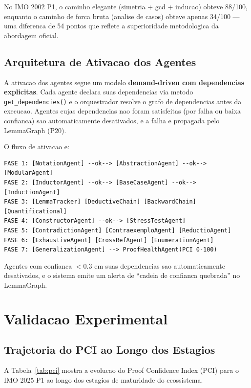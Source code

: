 \documentclass[5p]{elsarticle}
\begin{document}
No IMO 2002 P1, o caminho elegante (simetria + gcd + inducao) obteve 88/100,
enquanto o caminho de forca bruta (analise de casos) obteve apenas 34/100 —
uma diferenca de 54 pontos que reflete a superioridade metodologica da
abordagem oficial.

\subsection{Arquitetura de Ativacao dos Agentes}

A ativacao dos agentes segue um modelo \textbf{demand-driven com dependencias
explicitas}. Cada agente declara suas dependencias via metodo
\texttt{get\_dependencies()} e o orquestrador resolve o grafo de dependencias
antes da execucao. Agentes cujas dependencias nao foram satisfeitas (por
falha ou baixa confianca) sao automaticamente desativados, e a falha e
propagada pelo LemmaGraph (P20).

O fluxo de ativacao e:

\begin{Verbatim}[fontsize=\small]
FASE 1: [NotationAgent] --ok--> [AbstractionAgent] --ok--> [ModularAgent]
FASE 2: [InductorAgent] --ok--> [BaseCaseAgent] --ok--> [InductionAgent]
FASE 3: [LemmaTracker] [DeductiveChain] [BackwardChain] [Quantificational]
FASE 4: [ConstructorAgent] --ok--> [StressTestAgent]
FASE 5: [ContradictionAgent] [ContraexemploAgent] [ReductioAgent]
FASE 6: [ExhaustiveAgent] [CrossRefAgent] [EnumerationAgent]
FASE 7: [GeneralizationAgent] --> ProofHealthAgent(PCI 0-100)
\end{Verbatim}

Agentes com confianca $< 0.3$ em suas dependencias sao automaticamente
desativados, e o sistema emite um alerta de ``cadeia de confianca quebrada''
no LemmaGraph.

\section{Validacao Experimental}

\subsection{Trajetoria do PCI ao Longo dos Estagios}

A Tabela~\ref{tab:pci} mostra a evolucao do Proof Confidence Index (PCI)
para o IMO 2025 P1 ao longo dos estagios de maturidade do ecossistema.
\end{document}
